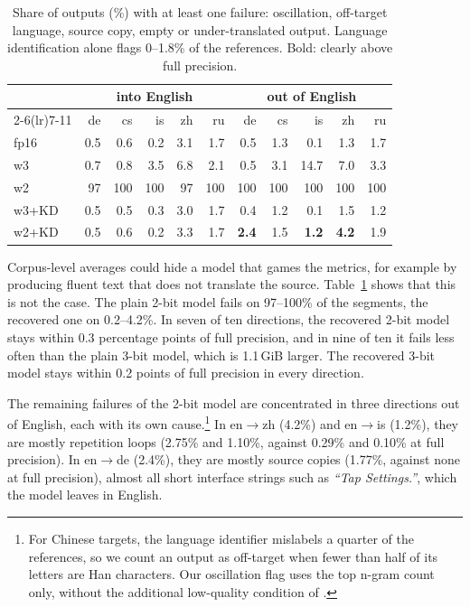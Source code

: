 \documentclass[10pt]{article}
\begin{document}
\begin{table}[t]
\centering
\footnotesize
\setlength{\tabcolsep}{1.6pt}
\begin{tabular}{lrrrrrrrrrr}
\toprule
 & \multicolumn{5}{c}{into English} & \multicolumn{5}{c}{out of English} \\
\cmidrule(lr){2-6}\cmidrule(lr){7-11}
 & de & cs & is & zh & ru & de & cs & is & zh & ru \\
\midrule
fp16   & 0.5 & 0.6 & 0.2 & 3.1 & 1.7 & 0.5 & 1.3 & 0.1 & 1.3 & 1.7 \\
w3     & 0.7 & 0.8 & 3.5 & 6.8 & 2.1 & 0.5 & 3.1 & 14.7 & 7.0 & 3.3 \\
w2     & 97 & 100 & 100 & 97 & 100 & 100 & 100 & 100 & 100 & 100 \\
\midrule
w3+KD  & 0.5 & 0.5 & 0.3 & 3.0 & 1.7 & 0.4 & 1.2 & 0.1 & 1.5 & 1.2 \\
w2+KD  & 0.5 & 0.6 & 0.2 & 3.3 & 1.7 & \textbf{2.4} & 1.5 & \textbf{1.2} & \textbf{4.2} & 1.9 \\
\bottomrule
\end{tabular}
\caption{Share of outputs (\%) with at least one failure: oscillation,
off-target language, source copy, empty or under-translated output. Language
identification alone flags 0--1.8\% of the references. Bold: clearly above full
precision.}
\label{tab:failures}
\end{table}

Corpus-level averages could hide a model that games the metrics, for example by
producing fluent text that does not translate the source. Table~\ref{tab:failures}
shows that this is not the case. The plain 2-bit model fails on 97--100\% of the
segments, the recovered one on 0.2--4.2\%. In seven of ten directions, the
recovered 2-bit model stays within 0.3 percentage points of full precision, and
in nine of ten it fails less often than the plain 3-bit model, which is
1.1\,GiB larger. The recovered 3-bit model stays within 0.2 points of full
precision in every direction.

The remaining failures of the 2-bit model are concentrated in three directions
out of English, each with its own cause.\footnote{For Chinese targets, the
language identifier mislabels a quarter of the references, so we count an output
as off-target when fewer than half of its letters are Han characters. Our
oscillation flag uses the top n-gram count only, without the additional
low-quality condition of \citet{guerreiro2023hallucinations}.} In
en$\rightarrow$zh (4.2\%) and en$\rightarrow$is (1.2\%), they are mostly
repetition loops (2.75\% and 1.10\%, against 0.29\% and 0.10\% at full
precision). In en$\rightarrow$de (2.4\%), they are mostly source copies (1.77\%,
against none at full precision), almost all short interface strings such as
\textit{``Tap Settings.''}, which the model leaves in English.
\end{document}
